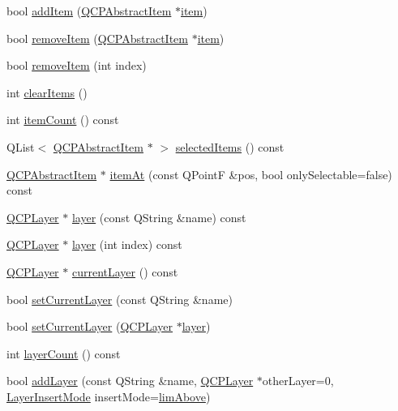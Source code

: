 \begin{DoxyCompactItemize}
\item 
bool \hyperlink{classQCustomPlot_aa500620379262321685cb7a7674cbd2a}{add\-Item} (\hyperlink{classQCPAbstractItem}{Q\-C\-P\-Abstract\-Item} $\ast$\hyperlink{classQCustomPlot_a3e842b5a65b1d17fbb96cfb1fa1314d1}{item})
\item 
bool \hyperlink{classQCustomPlot_ae04446557292551e8fb6e2c106e1848d}{remove\-Item} (\hyperlink{classQCPAbstractItem}{Q\-C\-P\-Abstract\-Item} $\ast$\hyperlink{classQCustomPlot_a3e842b5a65b1d17fbb96cfb1fa1314d1}{item})
\item 
bool \hyperlink{classQCustomPlot_abcfdda3d601c0441cab136137d715dea}{remove\-Item} (int index)
\item 
int \hyperlink{classQCustomPlot_abdfd07d4f0591d0cf967f85013fd3645}{clear\-Items} ()
\item 
int \hyperlink{classQCustomPlot_a6fc860e30df17fd5c46056bf6fe29390}{item\-Count} () const 
\item 
Q\-List$<$ \hyperlink{classQCPAbstractItem}{Q\-C\-P\-Abstract\-Item} $\ast$ $>$ \hyperlink{classQCustomPlot_a1a48b13547e2d9ac5cd6927516f47a2e}{selected\-Items} () const 
\item 
\hyperlink{classQCPAbstractItem}{Q\-C\-P\-Abstract\-Item} $\ast$ \hyperlink{classQCustomPlot_a793e4b04e0ede11a733021907368fa83}{item\-At} (const Q\-Point\-F \&pos, bool only\-Selectable=false) const 
\item 
\hyperlink{classQCPLayer}{Q\-C\-P\-Layer} $\ast$ \hyperlink{classQCustomPlot_aac492da01782820454e9136a8db28182}{layer} (const Q\-String \&name) const 
\item 
\hyperlink{classQCPLayer}{Q\-C\-P\-Layer} $\ast$ \hyperlink{classQCustomPlot_a1e73051e371f1815b48d8b355be0d2ab}{layer} (int index) const 
\item 
\hyperlink{classQCPLayer}{Q\-C\-P\-Layer} $\ast$ \hyperlink{classQCustomPlot_af73057345656cbd1463454982d808b00}{current\-Layer} () const 
\item 
bool \hyperlink{classQCustomPlot_a73a6dc47c653bb6f8f030abca5a11852}{set\-Current\-Layer} (const Q\-String \&name)
\item 
bool \hyperlink{classQCustomPlot_a23a4d3cadad1a0063c5fe19aac5659e6}{set\-Current\-Layer} (\hyperlink{classQCPLayer}{Q\-C\-P\-Layer} $\ast$\hyperlink{classQCustomPlot_aac492da01782820454e9136a8db28182}{layer})
\item 
int \hyperlink{classQCustomPlot_a1b3926884f5bd4bdda1495d8b3c891d0}{layer\-Count} () const 
\item 
bool \hyperlink{classQCustomPlot_ad5255393df078448bb6ac83fa5db5f52}{add\-Layer} (const Q\-String \&name, \hyperlink{classQCPLayer}{Q\-C\-P\-Layer} $\ast$other\-Layer=0, \hyperlink{classQCustomPlot_a75a8afbe6ef333b1f3d47abb25b9add7}{Layer\-Insert\-Mode} insert\-Mode=\hyperlink{classQCustomPlot_a75a8afbe6ef333b1f3d47abb25b9add7a062b0b7825650b432a713c0df6742d41}{lim\-Above})

\end{DoxyCompactItemize}
